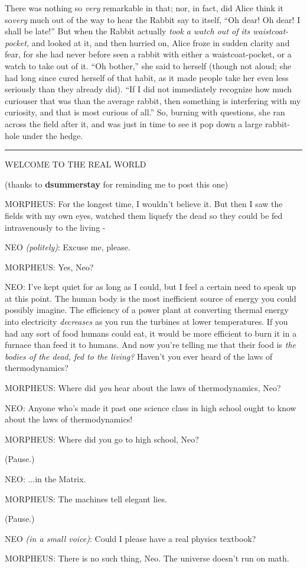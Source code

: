 There was nothing so \emph{very} remarkable in that; nor, in fact, did
Alice think it so\emph{very} much out of the way to hear the Rabbit say
to itself, ``Oh dear! Oh dear! I shall be late!'' But when the Rabbit
actually \emph{took a watch out of its waistcoat- pocket,} and looked at
it, and then hurried on, Alice froze in sudden clarity and fear, for she
had never before seen a rabbit with either a waistcoat-pocket, or a
watch to take out of it. ``Oh bother,'' she said to herself (though not
aloud; she had long since cured herself of that habit, as it made people
take her even less seriously than they already did). ``If I did not
immediately recognize how much curiouser that was than the average
rabbit, then something is interfering with my curiosity, and that is
most curious of all.'' So, burning with questions, she ran across the
field after it, and was just in time to see it pop down a large
rabbit-hole under the hedge.

\begin{center}\rule{3in}{0.4pt}\end{center}

WELCOME TO THE REAL WORLD

(thanks to \textbf{dsummerstay} for reminding me to post this one)

MORPHEUS: For the longest time, I wouldn't believe it. But then I saw
the fields with my own eyes, watched them liquefy the dead so they could
be fed intravenously to the living -

NEO \emph{(politely)}: Excuse me, please.

MORPHEUS: Yes, Neo?

NEO: I've kept quiet for as long as I could, but I feel a certain need
to speak up at this point. The human body is the most inefficient source
of energy you could possibly imagine. The efficiency of a power plant at
converting thermal energy into electricity \emph{decreases} as you run
the turbines at lower temperatures. If you had any sort of food humans
could eat, it would be more efficient to burn it in a furnace than feed
it to humans. And now you're telling me that their food is \emph{the
bodies of the dead, fed to the living?} Haven't you ever heard of the
laws of thermodynamics?

MORPHEUS: Where did \emph{you} hear about the laws of thermodynamics,
Neo?

NEO: Anyone who's made it past one science class in high school ought to
know about the laws of thermodynamics!

MORPHEUS: Where did you go to high school, Neo?

(Pause.)

NEO: ...in the Matrix.

MORPHEUS: The machines tell elegant lies.

(Pause.)

NEO \emph{(in a small voice)}: Could I please have a real physics
textbook?

MORPHEUS: There is no such thing, Neo. The universe doesn't run on math.
